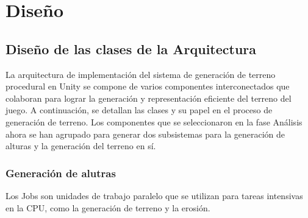 \section{Diseño}

\subsection{Diseño de las clases de la Arquitectura}

La arquitectura de implementación del sistema de generación de terreno procedural en Unity se compone de varios componentes interconectados que colaboran para lograr la generación y representación eficiente del terreno del juego. A continuación, se detallan las clases y su papel en el proceso de generación de terreno. Los componentes que se seleccionaron en la fase Análisis ahora se han agrupado para generar dos subsistemas para la generación de alturas y la generación del terreno en sí.

\subsubsection{Generación de alutras}

Los Jobs son unidades de trabajo paralelo que se utilizan para tareas intensivas en la CPU, como la generación de terreno y la erosión.

